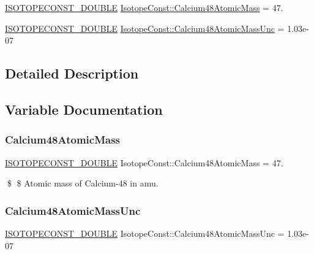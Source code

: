 \begin{DoxyCompactItemize}
\item 
\mbox{\hyperlink{group___isotope_const-_macros_ga8f45a7272ce02c0b4c65c44636ed719a}{I\+S\+O\+T\+O\+P\+E\+C\+O\+N\+S\+T\+\_\+\+D\+O\+U\+B\+LE}} \mbox{\hyperlink{group___isotope_const-_calcium-_ca48_ga37ac28c44ac3326bfb09644077898e07}{Isotope\+Const\+::\+Calcium48\+Atomic\+Mass}} = 47.
\item 
\mbox{\hyperlink{group___isotope_const-_macros_ga8f45a7272ce02c0b4c65c44636ed719a}{I\+S\+O\+T\+O\+P\+E\+C\+O\+N\+S\+T\+\_\+\+D\+O\+U\+B\+LE}} \mbox{\hyperlink{group___isotope_const-_calcium-_ca48_gaf457453614dba086dd839daa62e3b174}{Isotope\+Const\+::\+Calcium48\+Atomic\+Mass\+Unc}} = 1.\+03e-\/07
\end{DoxyCompactItemize}


\subsection{Detailed Description}


\subsection{Variable Documentation}
\mbox{\label{group___isotope_const-_calcium-_ca48_ga37ac28c44ac3326bfb09644077898e07}} 
\subsubsection{\texorpdfstring{Calcium48\+Atomic\+Mass}{Calcium48AtomicMass}}
{\footnotesize\ttfamily \mbox{\hyperlink{group___isotope_const-_macros_ga8f45a7272ce02c0b4c65c44636ed719a}{I\+S\+O\+T\+O\+P\+E\+C\+O\+N\+S\+T\+\_\+\+D\+O\+U\+B\+LE}} Isotope\+Const\+::\+Calcium48\+Atomic\+Mass = 47.}

\$ \$ Atomic mass of Calcium-\/48 in amu. \mbox{\label{group___isotope_const-_calcium-_ca48_gaf457453614dba086dd839daa62e3b174}} 
\subsubsection{\texorpdfstring{Calcium48\+Atomic\+Mass\+Unc}{Calcium48AtomicMassUnc}}
{\footnotesize\ttfamily \mbox{\hyperlink{group___isotope_const-_macros_ga8f45a7272ce02c0b4c65c44636ed719a}{I\+S\+O\+T\+O\+P\+E\+C\+O\+N\+S\+T\+\_\+\+D\+O\+U\+B\+LE}} Isotope\+Const\+::\+Calcium48\+Atomic\+Mass\+Unc = 1.\+03e-\/07}

